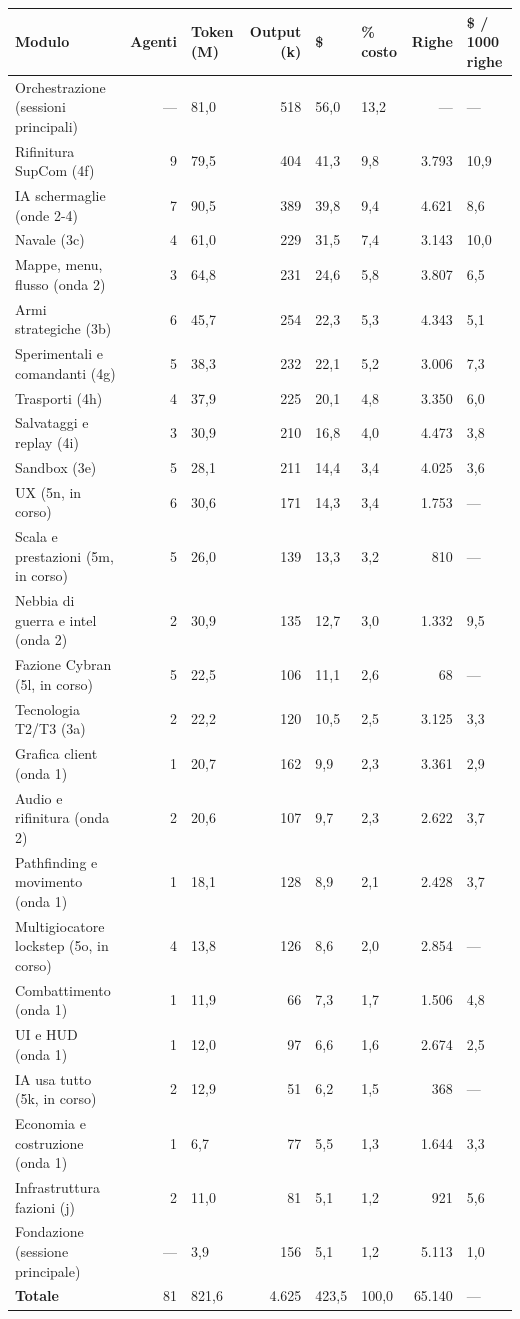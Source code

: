 \documentclass[11pt]{article}
\begin{document}
\begin{center}
\begin{tabular}{lrlrllrl}
Modulo & Agenti & Token (M) & Output (k) & \$ & \% costo & Righe & \$ / 1000 righe\\
\hline
Orchestrazione (sessioni principali) & — & 81,0 & 518 & 56,0 & 13,2 & — & —\\
Rifinitura SupCom (4f) & 9 & 79,5 & 404 & 41,3 & 9,8 & 3.793 & 10,9\\
IA schermaglie (onde 2-4) & 7 & 90,5 & 389 & 39,8 & 9,4 & 4.621 & 8,6\\
Navale (3c) & 4 & 61,0 & 229 & 31,5 & 7,4 & 3.143 & 10,0\\
Mappe, menu, flusso (onda 2) & 3 & 64,8 & 231 & 24,6 & 5,8 & 3.807 & 6,5\\
Armi strategiche (3b) & 6 & 45,7 & 254 & 22,3 & 5,3 & 4.343 & 5,1\\
Sperimentali e comandanti (4g) & 5 & 38,3 & 232 & 22,1 & 5,2 & 3.006 & 7,3\\
Trasporti (4h) & 4 & 37,9 & 225 & 20,1 & 4,8 & 3.350 & 6,0\\
Salvataggi e replay (4i) & 3 & 30,9 & 210 & 16,8 & 4,0 & 4.473 & 3,8\\
Sandbox (3e) & 5 & 28,1 & 211 & 14,4 & 3,4 & 4.025 & 3,6\\
UX (5n, in corso) & 6 & 30,6 & 171 & 14,3 & 3,4 & 1.753 & —\\
Scala e prestazioni (5m, in corso) & 5 & 26,0 & 139 & 13,3 & 3,2 & 810 & —\\
Nebbia di guerra e intel (onda 2) & 2 & 30,9 & 135 & 12,7 & 3,0 & 1.332 & 9,5\\
Fazione Cybran (5l, in corso) & 5 & 22,5 & 106 & 11,1 & 2,6 & 68 & —\\
Tecnologia T2/T3 (3a) & 2 & 22,2 & 120 & 10,5 & 2,5 & 3.125 & 3,3\\
Grafica client (onda 1) & 1 & 20,7 & 162 & 9,9 & 2,3 & 3.361 & 2,9\\
Audio e rifinitura (onda 2) & 2 & 20,6 & 107 & 9,7 & 2,3 & 2.622 & 3,7\\
Pathfinding e movimento (onda 1) & 1 & 18,1 & 128 & 8,9 & 2,1 & 2.428 & 3,7\\
Multigiocatore lockstep (5o, in corso) & 4 & 13,8 & 126 & 8,6 & 2,0 & 2.854 & —\\
Combattimento (onda 1) & 1 & 11,9 & 66 & 7,3 & 1,7 & 1.506 & 4,8\\
UI e HUD (onda 1) & 1 & 12,0 & 97 & 6,6 & 1,6 & 2.674 & 2,5\\
IA usa tutto (5k, in corso) & 2 & 12,9 & 51 & 6,2 & 1,5 & 368 & —\\
Economia e costruzione (onda 1) & 1 & 6,7 & 77 & 5,5 & 1,3 & 1.644 & 3,3\\
Infrastruttura fazioni (j) & 2 & 11,0 & 81 & 5,1 & 1,2 & 921 & 5,6\\
Fondazione (sessione principale) & — & 3,9 & 156 & 5,1 & 1,2 & 5.113 & 1,0\\
\hline
\textbf{Totale} & 81 & 821,6 & 4.625 & 423,5 & 100,0 & 65.140 & —\\
\end{tabular}
\end{center}
\end{document}
